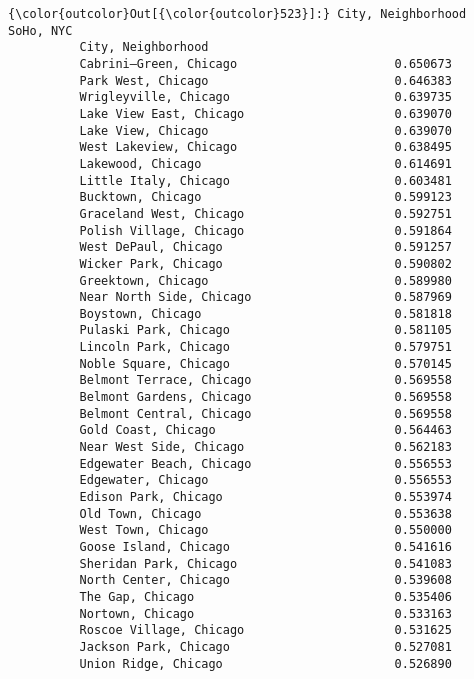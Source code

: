 \documentclass[11pt]{article}
\begin{document}
\begin{Verbatim}[commandchars=\\\{\}]
{\color{outcolor}Out[{\color{outcolor}523}]:} City, Neighborhood                         SoHo, NYC
          City, Neighborhood                                  
          Cabrini–Green, Chicago                      0.650673
          Park West, Chicago                          0.646383
          Wrigleyville, Chicago                       0.639735
          Lake View East, Chicago                     0.639070
          Lake View, Chicago                          0.639070
          West Lakeview, Chicago                      0.638495
          Lakewood, Chicago                           0.614691
          Little Italy, Chicago                       0.603481
          Bucktown, Chicago                           0.599123
          Graceland West, Chicago                     0.592751
          Polish Village, Chicago                     0.591864
          West DePaul, Chicago                        0.591257
          Wicker Park, Chicago                        0.590802
          Greektown, Chicago                          0.589980
          Near North Side, Chicago                    0.587969
          Boystown, Chicago                           0.581818
          Pulaski Park, Chicago                       0.581105
          Lincoln Park, Chicago                       0.579751
          Noble Square, Chicago                       0.570145
          Belmont Terrace, Chicago                    0.569558
          Belmont Gardens, Chicago                    0.569558
          Belmont Central, Chicago                    0.569558
          Gold Coast, Chicago                         0.564463
          Near West Side, Chicago                     0.562183
          Edgewater Beach, Chicago                    0.556553
          Edgewater, Chicago                          0.556553
          Edison Park, Chicago                        0.553974
          Old Town, Chicago                           0.553638
          West Town, Chicago                          0.550000
          Goose Island, Chicago                       0.541616
          Sheridan Park, Chicago                      0.541083
          North Center, Chicago                       0.539608
          The Gap, Chicago                            0.535406
          Nortown, Chicago                            0.533163
          Roscoe Village, Chicago                     0.531625
          Jackson Park, Chicago                       0.527081
          Union Ridge, Chicago                        0.526890

\end{Verbatim}
\end{document}
